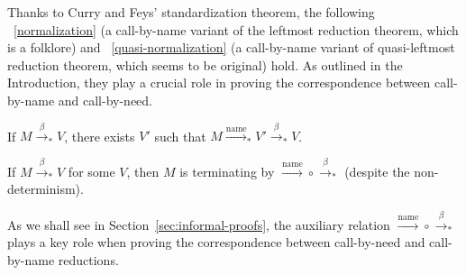 \documentclass{llncs}
\newcommand{\FULLBETA}{\xrightarrow{\beta}}
\newcommand{\CALLBYNAME}{\xrightarrow{\mathrm{name}}}
\newcommand{\RTCLOS}[1]{#1_*}
\begin{document}
Thanks to Curry and Feys' standardization theorem, the following \lemmaname~\ref{normalization} (a call-by-name variant of the leftmost reduction theorem, which is a folklore) and \lemmaname~\ref{quasi-normalization} (a call-by-name variant of quasi-leftmost reduction theorem, which seems to be original) hold.
As outlined in the Introduction, they play a crucial role in proving the correspondence between call-by-name and call-by-need.
%
\begin{lemma}\label{normalization}
	If $M\RTCLOS{\FULLBETA}V$, there exists $V'$ such that $M\RTCLOS{\CALLBYNAME}V' \RTCLOS{\FULLBETA} V$.
\end{lemma}
%
\begin{lemma}\label{quasi-normalization}
	If $M \RTCLOS{\FULLBETA} V$ for some $V$, then $M$ is terminating by ${\CALLBYNAME}\circ{\RTCLOS{\FULLBETA}}$ (despite the non-determinism).
\end{lemma}
%
As we shall see in Section~\ref{sec:informal-proofs}, the auxiliary relation ${\CALLBYNAME}\circ{\RTCLOS{\FULLBETA}}$ plays a key role when proving the correspondence between call-by-need and call-by-name reductions.
\end{document}
